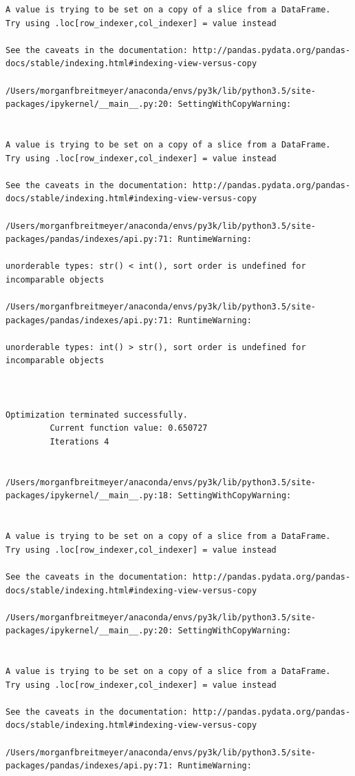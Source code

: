 \begin{lstlisting}
A value is trying to be set on a copy of a slice from a DataFrame.
Try using .loc[row_indexer,col_indexer] = value instead

See the caveats in the documentation: http://pandas.pydata.org/pandas-docs/stable/indexing.html#indexing-view-versus-copy

/Users/morganfbreitmeyer/anaconda/envs/py3k/lib/python3.5/site-packages/ipykernel/__main__.py:20: SettingWithCopyWarning:


A value is trying to be set on a copy of a slice from a DataFrame.
Try using .loc[row_indexer,col_indexer] = value instead

See the caveats in the documentation: http://pandas.pydata.org/pandas-docs/stable/indexing.html#indexing-view-versus-copy

/Users/morganfbreitmeyer/anaconda/envs/py3k/lib/python3.5/site-packages/pandas/indexes/api.py:71: RuntimeWarning:

unorderable types: str() < int(), sort order is undefined for incomparable objects

/Users/morganfbreitmeyer/anaconda/envs/py3k/lib/python3.5/site-packages/pandas/indexes/api.py:71: RuntimeWarning:

unorderable types: int() > str(), sort order is undefined for incomparable objects



Optimization terminated successfully.
         Current function value: 0.650727
         Iterations 4


/Users/morganfbreitmeyer/anaconda/envs/py3k/lib/python3.5/site-packages/ipykernel/__main__.py:18: SettingWithCopyWarning:


A value is trying to be set on a copy of a slice from a DataFrame.
Try using .loc[row_indexer,col_indexer] = value instead

See the caveats in the documentation: http://pandas.pydata.org/pandas-docs/stable/indexing.html#indexing-view-versus-copy

/Users/morganfbreitmeyer/anaconda/envs/py3k/lib/python3.5/site-packages/ipykernel/__main__.py:20: SettingWithCopyWarning:


A value is trying to be set on a copy of a slice from a DataFrame.
Try using .loc[row_indexer,col_indexer] = value instead

See the caveats in the documentation: http://pandas.pydata.org/pandas-docs/stable/indexing.html#indexing-view-versus-copy

/Users/morganfbreitmeyer/anaconda/envs/py3k/lib/python3.5/site-packages/pandas/indexes/api.py:71: RuntimeWarning:


\end{lstlisting}
